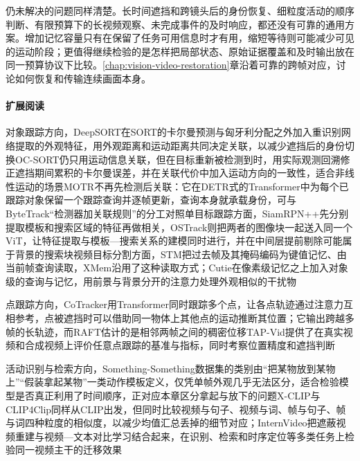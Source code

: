 仍未解决的问题同样清楚。长时间遮挡和跨镜头后的身份恢复、细粒度活动的顺序判断、有限预算下的长视频观察、未完成事件的及时响应，都还没有可靠的通用方案。增加记忆容量只有在保留了任务可用信息时才有用，缩短等待则可能减少可见的运动阶段；更值得继续检验的是怎样把局部状态、原始证据覆盖和及时输出放在同一预算协议下比较。\ref{chap:vision-video-restoration}章沿着可靠的跨帧对应，讨论如何恢复和传输连续画面本身。

\paragraph{扩展阅读}
对象跟踪方向，DeepSORT在SORT的卡尔曼预测与匈牙利分配之外加入重识别网络提取的外观特征，用外观距离和运动距离共同决定关联，以减少遮挡后的身份切换OC-SORT仍只用运动信息关联，但在目标重新被检测到时，用实际观测回溯修正遮挡期间累积的卡尔曼误差，并在关联代价中加入运动方向的一致性，适合非线性运动的场景MOTR不再先检测后关联：它在DETR式的Transformer中为每个已跟踪对象保留一个跟踪查询并逐帧更新，查询本身就承载身份，可与ByteTrack“检测器加关联规则”的分工对照单目标跟踪方面，SiamRPN++先分别提取模板和搜索区域的特征再做相关，OSTrack则把两者的图像块一起送入同一个ViT，让特征提取与模板—搜索关系的建模同时进行，并在中间层提前剔除可能属于背景的搜索块视频目标分割方面，STM把过去帧及其掩码编码为键值记忆、由当前帧查询读取，XMem沿用了这种读取方式；Cutie在像素级记忆之上加入对象级的查询与记忆，用前景与背景分开的注意力处理外观相似的干扰物

点跟踪方向，CoTracker用Transformer同时跟踪多个点，让各点轨迹通过注意力互相参考，点被遮挡时可以借助同一物体上其他点的运动推断其位置；它输出跨越多帧的长轨迹，而RAFT估计的是相邻两帧之间的稠密位移TAP-Vid提供了在真实视频和合成视频上评价任意点跟踪的基准与指标，同时考察位置精度和遮挡判断

活动识别与检索方向，Something-Something数据集的类别由“把某物放到某物上”“假装拿起某物”一类动作模板定义，仅凭单帧外观几乎无法区分，适合检验模型是否真正利用了时间顺序，正对应本章区分拿起与放下的问题X-CLIP与CLIP4Clip同样从CLIP出发，但同时比较视频与句子、视频与词、帧与句子、帧与词四种粒度的相似度，以减少均值汇总丢掉的细节对应；InternVideo把遮蔽视频重建与视频—文本对比学习结合起来，在识别、检索和时序定位等多类任务上检验同一视频主干的迁移效果
